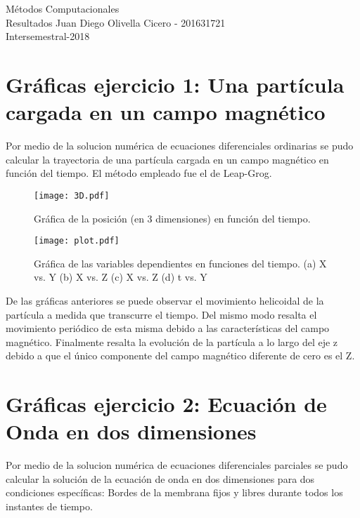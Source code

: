 \documentclass[11pt,letterpaper]{exam}
\begin{document}
\begin{center}
{\Large Métodos Computacionales} \\
Resultados Juan Diego Olivella Cicero - \textsc{201631721}\\
Intersemestral-2018\\
\end{center}


\noindent
\section{Gr\'aficas ejercicio 1: Una part\'icula cargada en un campo magn\'etico}

Por medio de la solucion num\'erica de ecuaciones diferenciales ordinarias se pudo calcular la trayectoria de una part\'icula cargada en un campo magn\'etico en funci\'on del tiempo. El m\'etodo empleado fue el de Leap-Grog.

\begin{figure}[h]
\begin{center}
\texttt{[image: 3D.pdf]}
\caption{\label{fig:typical}Gr\'afica de la posici\'on (en 3 dimensiones) en funci\'on del tiempo.}
\end{center}
\end{figure}

\begin{figure}[h]
\begin{center}
\texttt{[image: plot.pdf]}
\caption{\label{fig:typical}Gr\'afica de las variables dependientes en funciones del tiempo. (a) X vs. Y (b) X vs. Z (c) X vs. Z (d) t vs. Y}
\end{center}
\end{figure}

De las gr\'aficas anteriores se puede observar el movimiento helicoidal de la part\'icula a medida que transcurre el tiempo. Del mismo modo resalta el movimiento peri\'odico de esta misma debido a las caracter\'isticas del campo magn\'etico. Finalmente resalta la evoluci\'on de la part\'icula a lo largo del eje z debido a que el \'unico componente del campo magn\'etico diferente de cero es el Z.


\section{Gr\'aficas ejercicio 2: Ecuaci\'on de Onda en dos dimensiones}

Por medio de la solucion num\'erica de ecuaciones diferenciales parciales se pudo calcular la soluci\'on de la ecuaci\'on de onda en dos dimensiones para dos condiciones espec\'ificas: Bordes de la membrana fijos y libres durante todos los instantes de tiempo.
\end{document}
